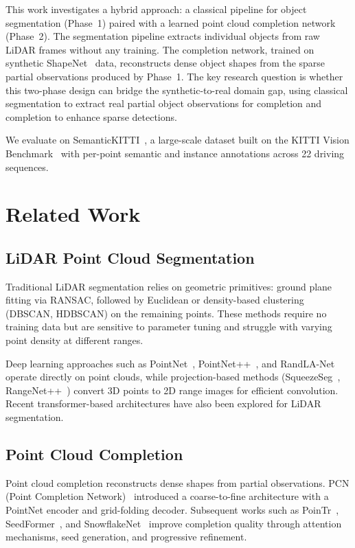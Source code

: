 \documentclass[runningheads]{llncs}
\begin{document}
This work investigates a hybrid approach: a classical pipeline for object segmentation (Phase~1) paired with a learned point cloud completion network (Phase~2). The segmentation pipeline extracts individual objects from raw LiDAR frames without any training. The completion network, trained on synthetic ShapeNet~\cite{chang2015shapenetinformationrich3dmodel} data, reconstructs dense object shapes from the sparse partial observations produced by Phase~1. The key research question is whether this two-phase design can bridge the synthetic-to-real domain gap, using classical segmentation to extract real partial object observations for completion and completion to enhance sparse detections.

We evaluate on SemanticKITTI~\cite{Behley_2019_ICCV}, a large-scale dataset built on the KITTI Vision Benchmark~\cite{geiger2012we} with per-point semantic and instance annotations across 22 driving sequences.


\section{Related Work}

\subsection{LiDAR Point Cloud Segmentation}

Traditional LiDAR segmentation relies on geometric primitives: ground plane fitting via RANSAC, followed by Euclidean or density-based clustering (DBSCAN, HDBSCAN) on the remaining points. These methods require no training data but are sensitive to parameter tuning and struggle with varying point density at different ranges.

Deep learning approaches such as PointNet~\cite{Qi_2017_CVPR}, PointNet++~\cite{NIPS2017_d8bf84be}, and RandLA-Net~\cite{Hu_2020_CVPR} operate directly on point clouds, while projection-based methods (SqueezeSeg~\cite{10.1109/ICRA.2018.8462926}, RangeNet++~\cite{milioto2019rangenet++}) convert 3D points to 2D range images for efficient convolution. Recent transformer-based architectures have also been explored for LiDAR segmentation.

\subsection{Point Cloud Completion}

Point cloud completion reconstructs dense shapes from partial observations. PCN (Point Completion Network)~\cite{yuan2019pcnpointcompletionnetwork} introduced a coarse-to-fine architecture with a PointNet encoder and grid-folding decoder. Subsequent works such as PoinTr~\cite{yu2021pointr}, SeedFormer~\cite{zhou2022seedformer}, and SnowflakeNet~\cite{xiang2021snowflakenet} improve completion quality through attention mechanisms, seed generation, and progressive refinement.
\end{document}
